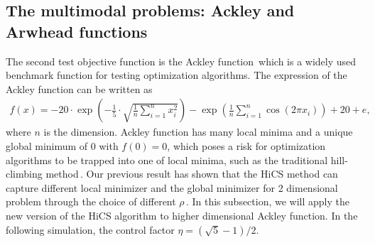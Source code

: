 \documentclass[final,1p,times]{elsarticle}
\begin{document}

\subsection{The multimodal problems: Ackley and Arwhead functions}
\label{subsec:minmulit}

The second test objective function is the Ackley
function\,\cite{dieterich2012empirical} which is a widely used 
benchmark function for testing optimization algorithms.
The expression of the Ackley function can be written as
\begin{align}
	f(x) =
	-20\cdot\exp\left(-\frac{1}{5}\cdot\sqrt{\frac{1}{n}\sum_{i=1}^n
	x_i^2}\right)-
	\exp\left(\frac{1}{n}\sum_{i=1}^n \cos(2\pi x_i)\right)+20+e,
	\label{eqn:ackley}
\end{align}
where $n$ is the dimension.
Ackley function has many local minima and a unique global
minimum of $0$ with $f(0)=0$, which poses a risk for
optimization algorithms to be trapped into one of local
minima, such as the traditional hill-climbing method\,\cite{back1996evolutionary}.
Our previous result has shown that the HiCS method can capture
different local minimizer and the global minimizer for 2
dimensional problem through the choice of different $\rho$\,\cite{huang2017hill}.
In this subsection, we will apply the new version of the HiCS
algorithm to higher dimensional Ackley function. 
In the following simulation, the control factor
$\eta=(\sqrt{5}-1)/2$.
\end{document}
